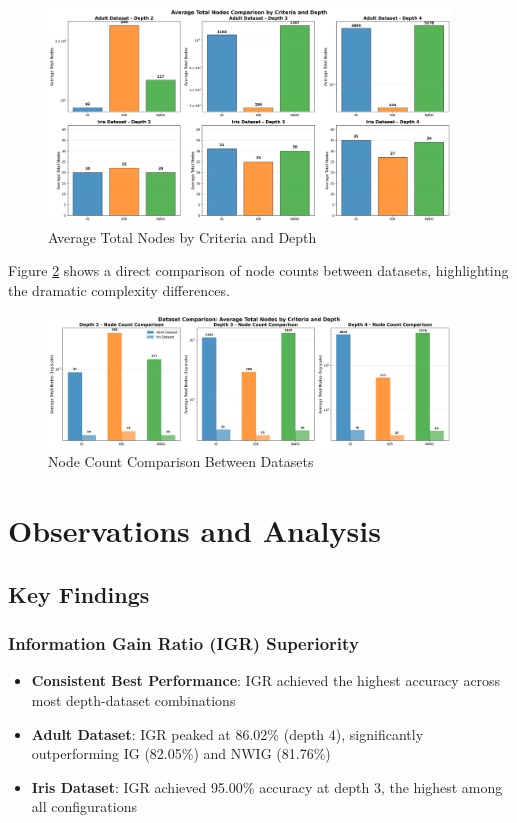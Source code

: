 \documentclass{article}
\begin{document}
\begin{figure}[H]
\centering
\includegraphics[width=0.95\textwidth]{nodes_bar_plots_by_depth.png}
\caption{Average Total Nodes by Criteria and Depth}
\label{fig:nodes_bars}
\end{figure}

Figure \ref{fig:nodes_combined} shows a direct comparison of node counts between datasets, highlighting the dramatic complexity differences.

\begin{figure}[H]
\centering
\includegraphics[width=0.95\textwidth]{combined_nodes_bar_comparison_by_depth.png}
\caption{Node Count Comparison Between Datasets}
\label{fig:nodes_combined}
\end{figure}

\section{Observations and Analysis}

\subsection{Key Findings}

\subsubsection{Information Gain Ratio (IGR) Superiority}
\begin{itemize}
    \item \textbf{Consistent Best Performance}: IGR achieved the highest accuracy across most depth-dataset combinations
    \item \textbf{Adult Dataset}: IGR peaked at 86.02\% (depth 4), significantly outperforming IG (82.05\%) and NWIG (81.76\%)
    \item \textbf{Iris Dataset}: IGR achieved 95.00\% accuracy at depth 3, the highest among all configurations
\end{itemize}
\end{document}

